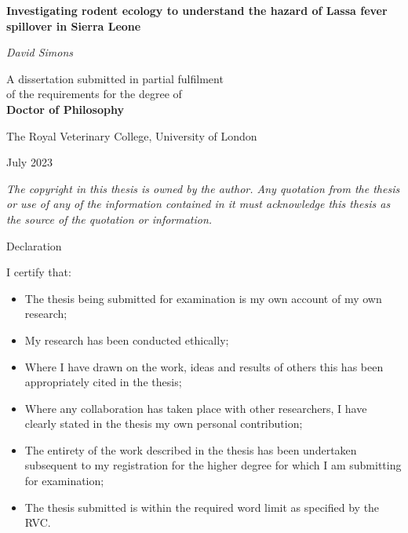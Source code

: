 \begin{titlepage}

\begin{centering}

\huge

\doublespacing

\vspace*{2cm}

{\bf Investigating rodent ecology to understand the hazard of Lassa fever spillover in Sierra Leone}

\vspace{1cm}

\large

{\em David Simons}

\vspace{2cm}

A dissertation submitted in partial fulfilment \\of the requirements for the degree of \\{\bf Doctor of Philosophy}

\vspace{1.5cm}

The Royal Veterinary College, University of London

\normalsize
July 2023

\vspace{1.5cm}

{\em The copyright in this thesis is owned by the author. Any quotation from the thesis or use of any of the information contained in it must acknowledge this thesis as the source of the quotation or information.}

\end{centering}

\end{titlepage}

\newpage

\Large

Declaration

\normalsize

I certify that:  

\begin{itemize}
  \item The thesis being submitted for examination is my own account of my own research;  
  \item My research has been conducted ethically;  
  \item Where I have drawn on the work, ideas and results of others this has been appropriately cited in the thesis;  
  \item Where any collaboration has taken place with other researchers, I have clearly stated in the thesis my own personal contribution;  
  \item The entirety of the work described in the thesis has been undertaken subsequent to my registration for the higher degree for which I am submitting for examination;  
  \item The thesis submitted is within the required word limit as specified by the RVC.  
\end{itemize}

